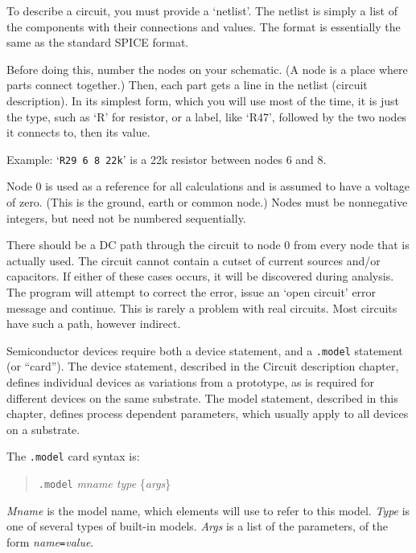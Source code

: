  To describe a circuit, you must provide a `netlist'.  The netlist is simply
a list of the components with their connections and values.  The format is
essentially the same as the standard SPICE format.

Before doing this, number the nodes on your schematic.  (A node is a place
where parts connect together.)  Then, each part gets a line in the netlist
(circuit description).  In its simplest form, which you will use most of the
time, it is just the type, such as `R' for resistor, or a label, like `R47',
followed by the two nodes it connects to, then its value.

Example:  `{\tt R29 6 8 22k}' is a 22k resistor between nodes 6 and 8.

 Node 0 is used as a reference for all calculations and is assumed to have a
voltage of zero.  (This is the ground, earth or common node.)  Nodes must be
nonnegative integers, but need not be numbered sequentially.

 There should be a DC path through the circuit to node 0 from every node
that is actually used.  The circuit cannot contain a cutset of current
sources and/or capacitors.  If either of these cases occurs, it will be
discovered during analysis.  The program will attempt to correct the error,
issue an `open circuit' error message and continue.  This is rarely a
problem with real circuits.  Most circuits have such a path, however
indirect.

Semiconductor devices require both a device statement, and a {\tt .model}
statement (or ``card'').  The device statement, described in the Circuit
description chapter, defines individual devices as variations from a
prototype, as is required for different devices on the same substrate.  The
model statement, described in this chapter, defines process dependent
parameters, which usually apply to all devices on a substrate.

The {\tt .model} card syntax is:
\begin{verse}
{\tt .model} {\it mname type} \{{\it args}\}
\end{verse}

{\it Mname} is the model name, which elements will use to refer to this
model.  {\it Type} is one of several types of built-in models.  {\it Args}
is a list of the parameters, of the form {\it name}{\tt =}{\it value}.

